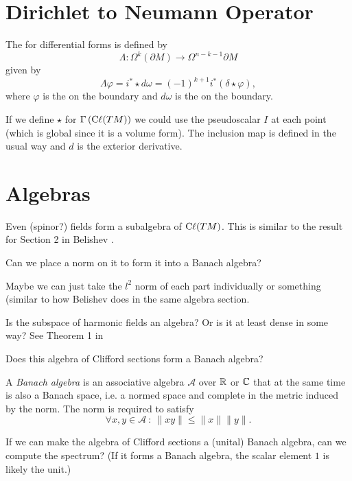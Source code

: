 \section*{Dirichlet to Neumann Operator}

The  for differential forms is defined by
\[
\Lambda \colon \Omega^k(\partial M) \to \Omega^{n-k-1}{\partial M}
\]
given by
\[
\Lambda \varphi = i^* \star d \omega=(-1)^{k+1}i^*(\delta \star \varphi),
\]
where $\varphi$ is the  on the boundary and $d\omega$ is the  on the boundary.

If we define $\star$ for $\Gamma\left(\mathrm{C}\ell(TM)\right)$ we could use the pseudoscalar $I$ at each point (which is global since it is a volume form). The inclusion map is defined in the usual way and $d$ is the exterior derivative.  

\section{Algebras}
Even (spinor?) fields form a subalgebra of $\mathrm{C}\ell(TM)$.  This is similar to the result for Section 2 in Belishev \cite{belishev_quaternion}. 
\begin{question}
Can we place a norm on it to form it into a Banach algebra? 
\end{question}

Maybe we can just take the $l^2$ norm of each part individually or something (similar to how Belishev does in the same algebra section.

\begin{question}
Is the subspace of harmonic fields an algebra? Or is it at least dense in some way? See Theorem 1 in \cite{belishev_quaternion}
\end{question}

\begin{question}
Does this algebra of Clifford sections form a Banach algebra?
\end{question}

\begin{definition}
A \emph{Banach algebra} is an associative algebra $\mathcal{A}$ over $\mathbb{R}$ or $\mathbb{C}$ that at the same time is also a Banach space, i.e. a normed space and complete in the metric induced by the norm. The norm is required to satisfy
\[
\forall x,y \in \mathcal{A}~\colon~ \|xy\|\leq \|x\|\|y\|.
\]
\end{definition}

\begin{question}
If we can make the algebra of Clifford sections a (unital) Banach algebra, can we compute the spectrum? (If it forms a Banach algebra, the scalar element $1$ is likely the unit.)
\end{question}

